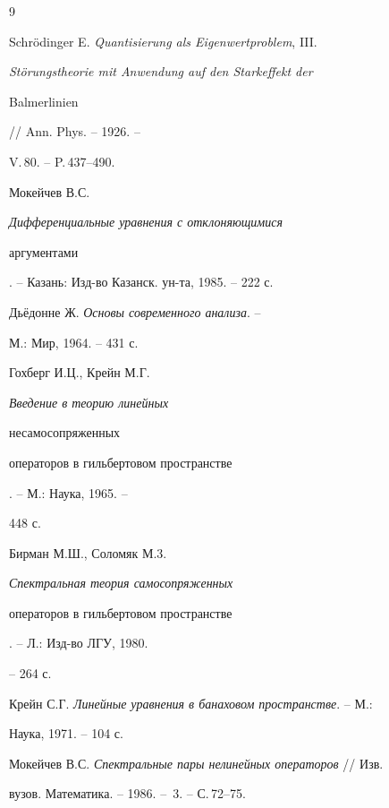 \begin{thebibliography}{9} 


 




Schr\"odinger E. {\em Quantisierung als Eigenwertproblem}, III. 


{\em St\"orungstheorie mit Anwendung auf den Starkeffekt der 


Balmerlinien} // Ann. Phys. -- 1926. -- 


V.\,80. -- P.\,437--490. 




Мокейчев В.С. {\em Дифференциальные уравнения с отклоняющимися 


аргументами}. -- Казань: Изд-во Казанск. ун-та, 1985. -- 222 с. 




Дь\"едонне Ж. {\em Основы современного анализа}. -- 


М.: Мир, 1964. -- 431 с. 




Гохберг И.Ц., Крейн М.Г. {\em Введение в теорию линейных 


несамосопряженных 


операторов в гильбертовом пространстве}. -- М.: Наука, 1965. -- 


448 с. 




Бирман М.Ш., Соломяк М.3. {\em Спектральная теория самосопряженных 


операторов в гильбертовом пространстве}. -- Л.: Изд-во ЛГУ, 1980. 


-- 264 с. 




Крейн С.Г. {\em Линейные уравнения в банаховом пространстве}. -- М.: 


Наука, 1971. -- 104 с. 




Мокейчев В.С. {\em Спектральные пары нелинейных операторов} // Изв. 


вузов. Математика. -- 1986. -- \No\,3. -- С.\,72--75. 


 


\end{thebibliography} 


 


\vskip 2cm 


 






 


\label{end} 


 


 


